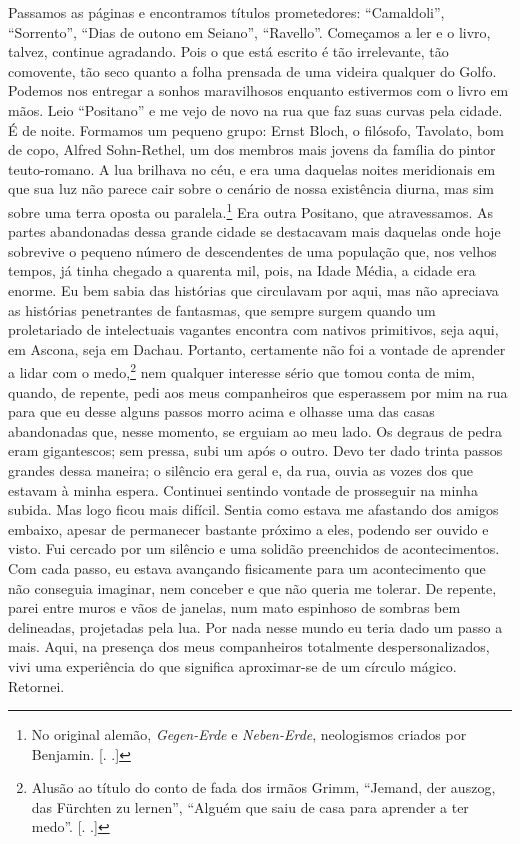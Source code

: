 Passamos as páginas e encontramos títulos prometedores: ``Camaldoli'',
``Sorrento'', ``Dias de outono em Seiano'', ``Ravello''. Começamos a ler
e o livro, talvez, continue agradando. Pois o que está escrito é tão
irrelevante, tão comovente, tão seco quanto a folha prensada de uma
videira qualquer do Golfo. Podemos nos entregar a sonhos maravilhosos
enquanto estivermos com o livro em mãos. Leio ``Positano'' e me vejo de
novo na rua que faz suas curvas pela cidade. É de noite. Formamos um
pequeno grupo: Ernst Bloch, o filósofo, Tavolato, bom de copo, Alfred
Sohn-Rethel, um dos membros mais jovens da família do pintor
teuto-romano. A lua brilhava no céu, e era uma daquelas noites
meridionais em que sua luz não parece cair sobre o cenário de nossa
existência diurna, mas sim sobre uma terra oposta ou paralela\label{supra10}.\footnote{No
  original alemão, \emph{Gegen-Erde} e \emph{Neben-Erde}, neologismos
  criados por Benjamin. [. .]} Era outra Positano, que
atravessamos. As partes abandonadas dessa grande cidade se destacavam
mais daquelas onde hoje sobrevive o pequeno número de descendentes de
uma população que, nos velhos tempos, já tinha chegado a quarenta mil,
pois, na Idade Média, a cidade era enorme. Eu bem sabia das histórias
que circulavam por aqui, mas não apreciava as histórias penetrantes de
fantasmas, que sempre surgem quando um proletariado de intelectuais
vagantes encontra com nativos primitivos, seja aqui, em Ascona, seja em
Dachau. Portanto, certamente não foi a vontade de aprender a lidar com o
medo,\footnote{Alusão ao título do conto de fada dos irmãos Grimm,
  ``Jemand, der auszog, das Fürchten zu lernen'', ``Alguém que saiu de
  casa para aprender a ter medo''. [. .]} nem qualquer
interesse sério que tomou conta de mim, quando, de repente, pedi aos
meus companheiros que esperassem por mim na rua para que eu desse alguns
passos morro acima e olhasse uma das casas abandonadas que, nesse
momento, se erguiam ao meu lado. Os degraus de pedra eram gigantescos;
sem pressa, subi um após o outro. Devo ter dado trinta passos grandes
dessa maneira; o silêncio era geral e, da rua, ouvia as vozes dos que
estavam à minha espera. Continuei sentindo vontade de prosseguir na
minha subida. Mas logo ficou mais difícil. Sentia como estava me
afastando dos amigos embaixo, apesar de permanecer bastante próximo a
eles, podendo ser ouvido e visto. Fui cercado por um silêncio e uma
solidão preenchidos de acontecimentos. Com cada passo, eu estava
avançando fisicamente para um acontecimento que não conseguia imaginar,
nem conceber e que não queria me tolerar. De repente, parei entre muros
e vãos de janelas, num mato espinhoso de sombras bem delineadas,
projetadas pela lua. Por nada nesse mundo eu teria dado um passo a mais.
Aqui, na presença dos meus companheiros totalmente despersonalizados,
vivi uma experiência do que significa aproximar-se de um círculo mágico.
Retornei.

